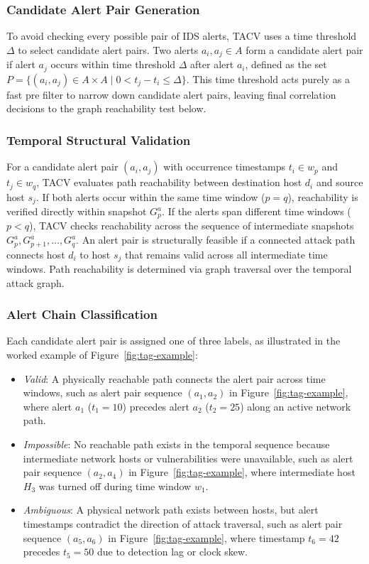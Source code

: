 \documentclass[runningheads]{llncs}
\begin{document}
\subsubsection{Candidate Alert Pair Generation}
To avoid checking every possible pair of IDS alerts, TACV uses a time threshold $\Delta$ to select candidate alert pairs. Two alerts $a_i, a_j \in A$ form a candidate alert pair if alert $a_j$ occurs within time threshold $\Delta$ after alert $a_i$, defined as the set $P = \{(a_i, a_j) \in A \times A \mid 0 < t_j - t_i \le \Delta\}$. This time threshold acts purely as a fast pre filter to narrow down candidate alert pairs, leaving final correlation decisions to the graph reachability test below.

\subsubsection{Temporal Structural Validation}
For a candidate alert pair $(a_i, a_j)$ with occurrence timestamps $t_i \in w_p$ and $t_j \in w_q$, TACV evaluates path reachability between destination host $d_i$ and source host $s_j$. If both alerts occur within the same time window ($p = q$), reachability is verified directly within snapshot $G_p^a$. If the alerts span different time windows ($p < q$), TACV checks reachability across the sequence of intermediate snapshots $G_p^a, G_{p+1}^a, \ldots, G_q^a$. An alert pair is structurally feasible if a connected attack path connects host $d_i$ to host $s_j$ that remains valid across all intermediate time windows. Path reachability is determined via graph traversal over the temporal attack graph.

\subsubsection{Alert Chain Classification}
Each candidate alert pair is assigned one of three labels, as illustrated in the worked example of Figure~\ref{fig:tag-example}:
\begin{itemize}\setlength{\itemsep}{1pt}\setlength{\parskip}{0pt}
	\item \emph{Valid}: A physically reachable path connects the alert pair across time windows, such as alert pair sequence $(a_1, a_2)$ in Figure~\ref{fig:tag-example}, where alert $a_1$ ($t_1=10$) precedes alert $a_2$ ($t_2=25$) along an active network path.
	\item \emph{Impossible}: No reachable path exists in the temporal sequence because intermediate network hosts or vulnerabilities were unavailable, such as alert pair sequence $(a_2, a_4)$ in Figure~\ref{fig:tag-example}, where intermediate host $H_3$ was turned off during time window $w_1$.
	\item \emph{Ambiguous}: A physical network path exists between hosts, but alert timestamps contradict the direction of attack traversal, such as alert pair sequence $(a_5, a_6)$ in Figure~\ref{fig:tag-example}, where timestamp $t_6=42$ precedes $t_5=50$ due to detection lag or clock skew.
\end{itemize}
\end{document}
